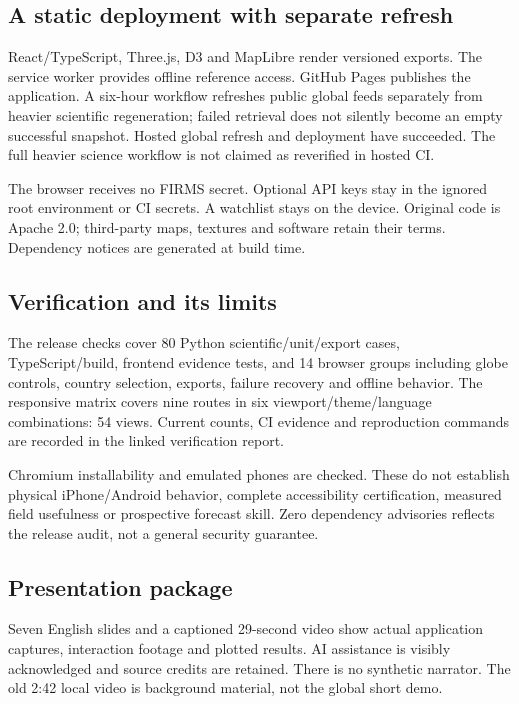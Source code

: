 \subsection{A static deployment with separate refresh}
React/TypeScript, Three.js, D3 and MapLibre render versioned exports. The service worker provides offline reference access. GitHub Pages publishes the application. A six-hour workflow refreshes public global feeds separately from heavier scientific regeneration; failed retrieval does not silently become an empty successful snapshot. Hosted global refresh and deployment have succeeded. The full heavier science workflow is not claimed as reverified in hosted CI.

The browser receives no FIRMS secret. Optional API keys stay in the ignored root environment or CI secrets. A watchlist stays on the device. Original code is Apache 2.0; third-party maps, textures and software retain their terms. Dependency notices are generated at build time.

\subsection{Verification and its limits}
The release checks cover 80 Python scientific/unit/export cases, TypeScript/build, frontend evidence tests, and 14 browser groups including globe controls, country selection, exports, failure recovery and offline behavior. The responsive matrix covers nine routes in six viewport/theme/language combinations: 54 views. Current counts, CI evidence and reproduction commands are recorded in the linked verification report.

Chromium installability and emulated phones are checked. These do not establish physical iPhone/Android behavior, complete accessibility certification, measured field usefulness or prospective forecast skill. Zero dependency advisories reflects the release audit, not a general security guarantee.

\subsection{Presentation package}
Seven English slides and a captioned 29-second video show actual application captures, interaction footage and plotted results. AI assistance is visibly acknowledged and source credits are retained. There is no synthetic narrator. The old 2:42 local video is background material, not the global short demo.


